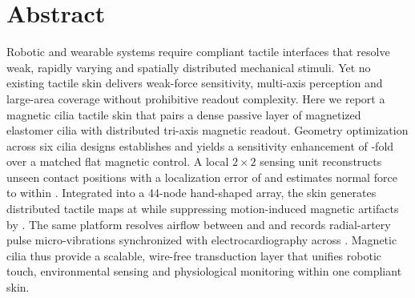 \section*{Abstract}

Robotic and wearable systems require compliant tactile interfaces that resolve
weak, rapidly varying and spatially distributed mechanical stimuli. Yet no
existing tactile skin delivers weak-force sensitivity, multi-axis perception and
large-area coverage without prohibitive readout complexity. Here we report a
magnetic cilia tactile skin that pairs a dense passive layer of magnetized
elastomer cilia with distributed tri-axis magnetic readout. Geometry
optimization across six cilia designs establishes  and yields a sensitivity
enhancement of -fold over a matched flat magnetic control. A local $2\times2$ sensing
unit reconstructs unseen contact positions with a localization error of
 and estimates normal force to
within . Integrated into a 44-node hand-shaped array, the
skin generates distributed tactile maps at  while suppressing motion-induced magnetic artifacts by .
The same platform resolves airflow between  and  and records
radial-artery pulse micro-vibrations synchronized with electrocardiography
across . Magnetic cilia thus provide a scalable,
wire-free transduction layer that unifies robotic touch, environmental sensing
and physiological monitoring within one compliant skin.
